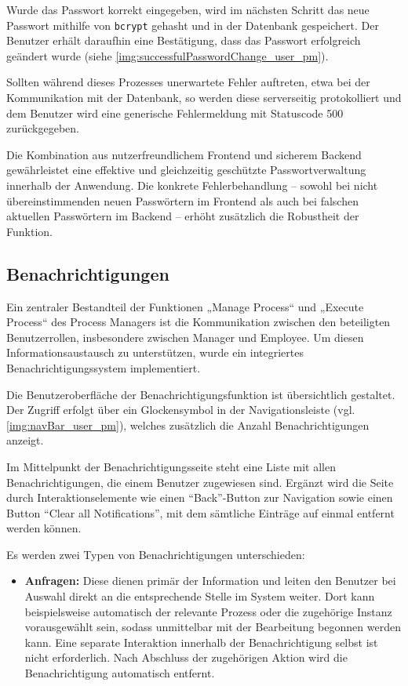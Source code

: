 Wurde das Passwort korrekt eingegeben, wird im nächsten Schritt das neue Passwort mithilfe von \texttt{bcrypt} gehasht  und in der Datenbank gespeichert. Der Benutzer erhält daraufhin eine Bestätigung, dass das Passwort erfolgreich geändert wurde (siehe \autoref{img:successfulPasswordChange_user_pm}).

Sollten während dieses Prozesses unerwartete Fehler auftreten, etwa bei der Kommunikation mit der Datenbank, so werden diese serverseitig protokolliert und dem Benutzer wird eine generische Fehlermeldung mit Statuscode 500 zurückgegeben.

Die Kombination aus nutzerfreundlichem Frontend und sicherem Backend gewährleistet eine effektive und gleichzeitig geschützte Passwortverwaltung innerhalb der Anwendung. Die konkrete Fehlerbehandlung – sowohl bei nicht übereinstimmenden neuen Passwörtern im Frontend als auch bei falschen aktuellen Passwörtern im Backend – erhöht zusätzlich die Robustheit der Funktion.

\newpage
\subsection{Benachrichtigungen}
Ein zentraler Bestandteil der Funktionen „Manage Process“ und „Execute Process“ des Process Managers ist die Kommunikation zwischen den beteiligten Benutzerrollen, insbesondere zwischen Manager und Employee. Um diesen Informationsaustausch zu unterstützen, wurde ein integriertes Benachrichtigungssystem implementiert.

Die Benutzeroberfläche der Benachrichtigungsfunktion ist übersichtlich gestaltet. Der Zugriff erfolgt über ein Glockensymbol in der Navigationsleiste (vgl. \autoref{img:navBar_user_pm}), welches zusätzlich die Anzahl Benachrichtigungen anzeigt.

Im Mittelpunkt der Benachrichtigungsseite steht eine Liste mit allen Benachrichtigungen, die einem Benutzer zugewiesen sind. Ergänzt wird die Seite durch Interaktionselemente wie einen \enquote{Back}-Button zur Navigation sowie einen Button \enquote{Clear all Notifications}, mit dem sämtliche Einträge auf einmal entfernt werden können.


Es werden zwei Typen von Benachrichtigungen unterschieden:

\begin{itemize}
    \item \textbf{Anfragen:} Diese dienen primär der Information und leiten den Benutzer bei Auswahl direkt an die entsprechende Stelle im System weiter. Dort kann beispielsweise automatisch der relevante Prozess oder die zugehörige Instanz vorausgewählt sein, sodass unmittelbar mit der Bearbeitung begonnen werden kann. Eine separate Interaktion innerhalb der Benachrichtigung selbst ist nicht erforderlich. Nach Abschluss der zugehörigen Aktion wird die Benachrichtigung automatisch entfernt.
\end{itemize}

